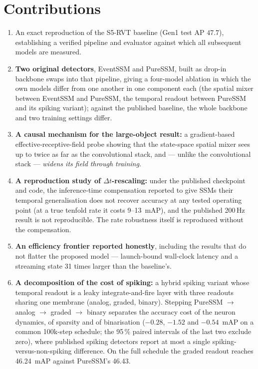 \documentclass[11pt, a4paper]{report}
\begin{document}
\section{Contributions}
\label{sec:contributions}
\begin{enumerate}
  \item An exact reproduction of the S5-RVT baseline (Gen1 test AP $47.7$), establishing a verified
        pipeline and evaluator against which all subsequent models are measured.
  \item \textbf{Two original detectors}, EventSSM and PureSSM, built as drop-in backbone swaps into
        that pipeline, giving a four-model ablation in which the own models differ from one another in
        one component each (the spatial mixer between EventSSM and PureSSM, the temporal readout between
        PureSSM and its spiking variant); against the published baseline, the whole backbone and two
        training settings differ.
  \item \textbf{A causal mechanism for the large-object result:} a gradient-based effective-receptive-field
        probe showing that the state-space spatial mixer sees up to twice as far as the convolutional
        stack, and --- unlike the convolutional stack --- \emph{widens its field through training}.
  \item \textbf{A reproduction study of $\Delta t$-rescaling:} under the published checkpoint and code,
        the inference-time compensation reported to give SSMs their temporal generalisation does not
        recover accuracy at any tested operating point (at a true tenfold rate it costs 9--13~mAP), and
        the published 200\,Hz result is not reproducible. The rate robustness itself is reproduced
        without the compensation.
  \item \textbf{An efficiency frontier reported honestly}, including the results that do not flatter
        the proposed model --- launch-bound wall-clock latency and a streaming state 31 times larger
        than the baseline's.
  \item \textbf{A decomposition of the cost of spiking:} a hybrid spiking variant whose temporal readout is a
        leaky integrate-and-fire layer with three readouts sharing one membrane (analog, graded, binary).
        Stepping PureSSM $\rightarrow$ analog $\rightarrow$ graded $\rightarrow$ binary separates the
        accuracy cost of the neuron dynamics, of sparsity and of binarisation ($-0.28$, $-1.52$ and
        $-0.54$~mAP on a common 100k-step schedule; the 95\,\% paired intervals of the last two exclude zero),
        where published spiking
        detectors report at most a single spiking-versus-non-spiking difference. On the full schedule the
        graded readout reaches 46.24~mAP against PureSSM's 46.43.
\end{enumerate}
\end{document}
